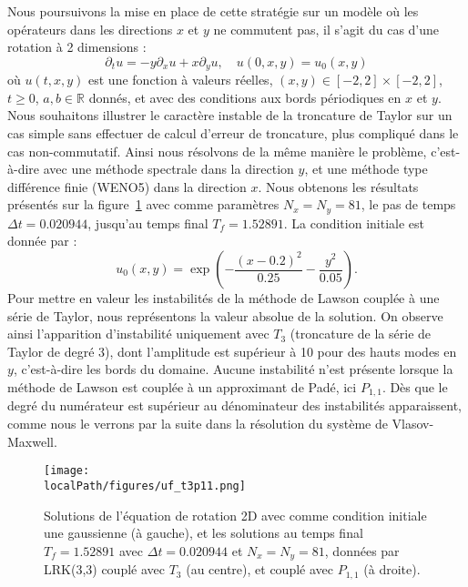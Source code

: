 Nous poursuivons la mise en place de cette stratégie sur un modèle où les opérateurs dans les directions $x$ et $y$ ne commutent pas, il s'agit du cas d'une rotation à 2 dimensions :
$$
  \partial_t u = -y\partial_x u + x\partial_y u,\quad u(0,x,y)=u_0(x,y)
$$
où $u(t,x,y)$ est une fonction à valeurs réelles, $(x,y)\in[-2,2]\times[-2,2]$, $t\geq0$, $a,b\in\mathbb{R}$ donnés, et avec des conditions aux bords périodiques en $x$ et $y$. Nous souhaitons illustrer le caractère instable de la troncature de Taylor sur un cas simple sans effectuer de calcul d'erreur de troncature, plus compliqué dans le cas non-commutatif. Ainsi nous résolvons de la même manière le problème, c'est-à-dire avec une méthode spectrale dans la direction $y$, et une méthode type différence finie (WENO5) dans la direction $x$. Nous obtenons les résultats présentés sur la figure~\ref{fig:uft3p11} avec comme paramètres $N_x=N_y=81$, le pas de temps $\Delta t=0.020944$, jusqu'au temps final $T_f=1.52891$. La condition initiale est donnée par :
$$
  u_0(x,y) = \exp( -\frac{(x-0.2)^2}{0.25} - \frac{y^2}{0.05} ).
$$
Pour mettre en valeur les instabilités de la méthode de Lawson couplée à une série de Taylor, nous représentons la valeur absolue de la solution. On observe ainsi l'apparition d'instabilité uniquement avec $T_3$ (troncature de la série de Taylor de degré 3), dont l'amplitude est supérieur à 10 pour des hauts modes en $y$, c'est-à-dire les bords du domaine. Aucune instabilité n'est présente lorsque la méthode de Lawson est couplée à un approximant de Padé, ici $P_{1,1}$. Dès que le degré du numérateur est supérieur au dénominateur des instabilités apparaissent, comme nous le verrons par la suite dans la résolution du système de Vlasov-Maxwell.

\begin{figure}
  \centering
  \texttt{[image: \\localPath/figures/uf\_t3p11.png]}
    \caption{Solutions de l'équation de rotation 2D avec comme condition initiale une gaussienne (à gauche), et les solutions au temps final $T_f=1.52891$ avec $\Delta t=0.020944$ et $N_x=N_y=81$, données par LRK(3,3) couplé avec $T_3$ (au centre), et couplé avec $P_{1,1}$ (à droite).}
    \label{fig:uft3p11}
\end{figure}

